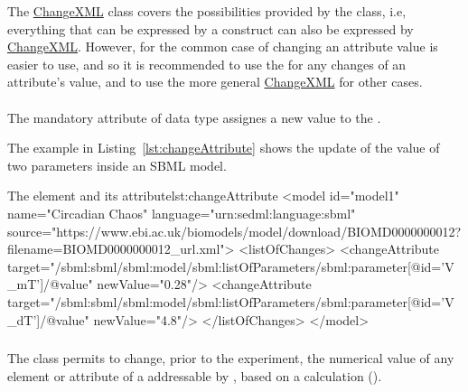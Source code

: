 
The \hyperref[class:changeXml]{ChangeXML} class covers the possibilities provided by the  class, i.e, everything that can be expressed by a  construct can also be expressed by \hyperref[class:changeXml]{ChangeXML}. However, for the common case of changing an attribute value  is easier to use, and so it is recommended to use the  for any changes of an attribute's value, and to use the more general \hyperref[class:changeXml]{ChangeXML} for other cases.


\paragraph*{}
\label{sec:newValue}
The mandatory  attribute of data type  assignes a new value to the .

The example in Listing~\ref{lst:changeAttribute} shows the update of the value of two parameters inside an SBML model.

\begin{myXmlLst}{The  element and its  attribute}{lst:changeAttribute}
<model id="model1" name="Circadian Chaos" language="urn:sedml:language:sbml" 
	source="https://www.ebi.ac.uk/biomodels/model/download/BIOMD0000000012?filename=BIOMD0000000012_url.xml">
	<listOfChanges>
		<changeAttribute target="/sbml:sbml/sbml:model/sbml:listOfParameters/sbml:parameter[@id='V_mT']/@value" newValue="0.28"/>
  		<changeAttribute target="/sbml:sbml/sbml:model/sbml:listOfParameters/sbml:parameter[@id='V_dT']/@value" newValue="4.8"/>
	</listOfChanges>
</model>
\end{myXmlLst}


\subsubsection{}
\label{class:computeChange}
The  class permits to change, prior to the experiment, the numerical value of any  element or attribute of a \Model addressable by , based on a calculation ().  

